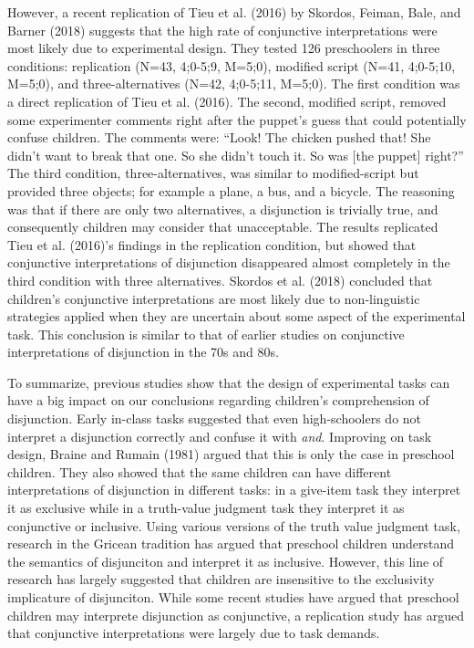 \documentclass[floatsintext,man]{apa6}
\theoremstyle{definition}
\theoremstyle{definition}
\theoremstyle{definition}
\theoremstyle{remark}
\begin{document}
However, a recent replication of Tieu et al. (2016) by Skordos, Feiman,
Bale, and Barner (2018) suggests that the high rate of conjunctive
interpretations were most likely due to experimental design. They tested
126 preschoolers in three conditions: replication (N=43, 4;0-5;9,
M=5;0), modified script (N=41, 4;0-5;10, M=5;0), and three-alternatives
(N=42, 4;0-5;11, M=5;0). The first condition was a direct replication of
Tieu et al. (2016). The second, modified script, removed some
experimenter comments right after the puppet's guess that could
potentially confuse children. The comments were: \enquote{Look! The
chicken pushed that! She didn't want to break that one. So she didn't
touch it. So was {[}the puppet{]} right?} The third condition,
three-alternatives, was similar to modified-script but provided three
objects; for example a plane, a bus, and a bicycle. The reasoning was
that if there are only two alternatives, a disjunction is trivially
true, and consequently children may consider that unacceptable. The
results replicated Tieu et al. (2016)'s findings in the replication
condition, but showed that conjunctive interpretations of disjunction
disappeared almost completely in the third condition with three
alternatives. Skordos et al. (2018) concluded that children's
conjunctive interpretations are most likely due to non-linguistic
strategies applied when they are uncertain about some aspect of the
experimental task. This conclusion is similar to that of earlier studies
on conjunctive interpretations of disjunction in the 70s and 80s.

To summarize, previous studies show that the design of experimental
tasks can have a big impact on our conclusions regarding children's
comprehension of disjunction. Early in-class tasks suggested that even
high-schoolers do not interpret a disjunction correctly and confuse it
with \emph{and}. Improving on task design, Braine and Rumain (1981)
argued that this is only the case in preschool children. They also
showed that the same children can have different interpretations of
disjunction in different tasks: in a give-item task they interpret it as
exclusive while in a truth-value judgment task they interpret it as
conjunctive or inclusive. Using various versions of the truth value
judgment task, research in the Gricean tradition has argued that
preschool children understand the semantics of disjunciton and interpret
it as inclusive. However, this line of research has largely suggested
that children are insensitive to the exclusivity implicature of
disjunciton. While some recent studies have argued that preschool
children may interprete disjunction as conjunctive, a replication study
has argued that conjunctive interpretations were largely due to task
demands.
\end{document}
